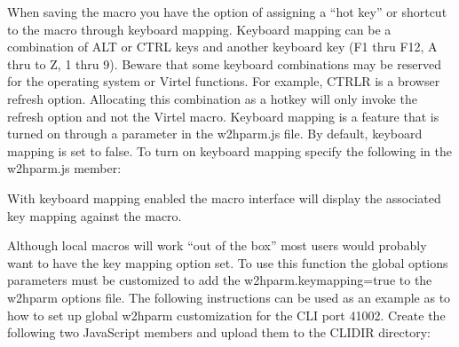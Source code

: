 \documentclass[letterpaper,10pt,english]{sphinxmanual}
\begin{document}
\sphinxAtStartPar
{}

\ignorespaces 
\sphinxAtStartPar
{}

\sphinxAtStartPar
When saving the macro you have the option of assigning a “hot key” or shortcut to the macro through keyboard mapping. Keyboard mapping can be a combination of ALT or CTRL keys and another keyboard key (F1 thru F12, A thru to Z, 1 thru 9). Beware that some keyboard combinations may be reserved for the operating system or Virtel functions. For example, CTRL\sphinxhyphen{}R is a browser refresh option. Allocating this combination as a hotkey will only invoke the refresh option and not the Virtel macro. Keyboard mapping is a feature that is turned on through a parameter in the w2hparm.js file. By default, keyboard mapping is set to false. To turn on keyboard mapping specify the following in the w2hparm.js member:

\begin{sphinxVerbatim}[commandchars=\\\{\}]
\end{sphinxVerbatim}

\sphinxAtStartPar
With keyboard mapping enabled the macro interface will display the associated key mapping against the macro.

\sphinxAtStartPar
{}

\sphinxAtStartPar
{}

\ignorespaces 
\sphinxAtStartPar
{}

\sphinxAtStartPar
Although local macros will work “out of the box” most users would probably want to have the key mapping option set. To use this function the global options parameters must be customized to add the w2hparm.keymapping=true to the w2hparm options file. The following instructions can be used as an example as to how to set up global w2hparm customization for the CLI port 41002. Create the following two JavaScript members and upload them to the CLI\sphinxhyphen{}DIR directory:
\end{document}

